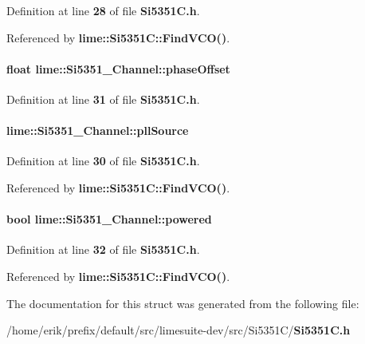 Definition at line {\bf 28} of file {\bf Si5351\+C.\+h}.



Referenced by {\bf lime\+::\+Si5351\+C\+::\+Find\+V\+C\+O()}.

\paragraph[{phase\+Offset}]{\setlength{\rightskip}{0pt plus 5cm}float lime\+::\+Si5351\+\_\+\+Channel\+::phase\+Offset}\label{structlime_1_1Si5351__Channel_a1cd780197caeaf4cb9c3d2cf74ca3281}


Definition at line {\bf 31} of file {\bf Si5351\+C.\+h}.

\paragraph[{pll\+Source}]{ lime\+::\+Si5351\+\_\+\+Channel\+::pll\+Source}\label{structlime_1_1Si5351__Channel_a02cc24d40a1b3d540c649fcaf344d3bd}


Definition at line {\bf 30} of file {\bf Si5351\+C.\+h}.



Referenced by {\bf lime\+::\+Si5351\+C\+::\+Find\+V\+C\+O()}.

\paragraph[{powered}]{\setlength{\rightskip}{0pt plus 5cm}bool lime\+::\+Si5351\+\_\+\+Channel\+::powered}\label{structlime_1_1Si5351__Channel_aa571264c4b6205e8efd32d0edbd6c3aa}


Definition at line {\bf 32} of file {\bf Si5351\+C.\+h}.



Referenced by {\bf lime\+::\+Si5351\+C\+::\+Find\+V\+C\+O()}.



The documentation for this struct was generated from the following file\+:\begin{DoxyCompactItemize}
\item 
/home/erik/prefix/default/src/limesuite-\/dev/src/\+Si5351\+C/{\bf Si5351\+C.\+h}\end{DoxyCompactItemize}

